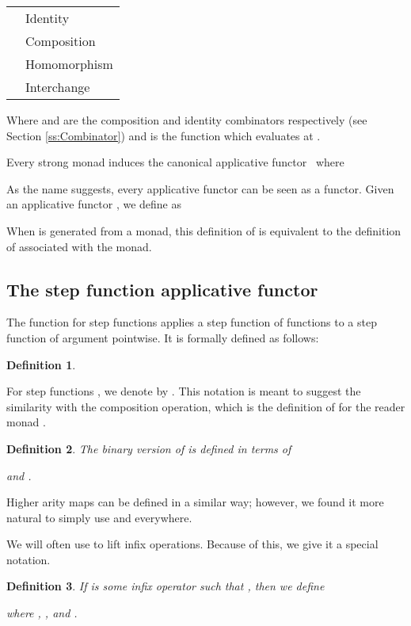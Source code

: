 \documentclass{elsarticle}
\newcommand{\tmstrong}[1]{\textbf{#1}}
\newcommand{\tmtextsf}[1]{{\sffamily{#1}}}
\newcommand{\tmtextup}[1]{{\upshape{#1}}}
\newtheorem{definition}{Definition}
\newcommand{\comp}{\text{{\tmstrong{\tmtextup{B}}}}}
\newcommand{\id}{\text{{\tmstrong{\tmtextup{I}}}}}
\begin{document}
\begin{center}
  \begin{tabular}{ll}
     & Identity\\
     &
    Composition\\
     & Homomorphism\\
     & Interchange
  \end{tabular}
\end{center}

Where {\comp} and {\id} are the composition and identity combinators
respectively (see Section \ref{ss:Combinator}) and  is the function which evaluates at .

Every strong monad induces the canonical applicative
functor~{\cite{mcbride:2008}} where

As the name suggests, every applicative functor can be seen as a functor.
Given an applicative functor , we define
 as

When  is generated from a monad, this definition of
\tmtextsf{map} is equivalent to the definition of \tmtextsf{map} associated
with the monad.

\subsection{The step function applicative functor}\label{ss:SFasAF}The
 function for
step functions  applies a step function of functions to a step
function of argument pointwise. It is formally defined as follows:
\begin{definition}
  
\end{definition}

For step functions , we denote  by . This notation is meant to suggest the similarity with the
composition operation, which is the definition of  for
the reader monad .

\begin{definition}
  The binary version of  is defined in terms of

  and .
  
\end{definition}

Higher arity maps can be defined in a similar way; however, we found it more
natural to simply use  and 
everywhere.

We will often use  to lift infix operations. Because of
this, we give it a special notation.

\begin{definition}
  If  is some infix operator such that , then we define
  
  where , , and .
\end{definition}
\end{document}
